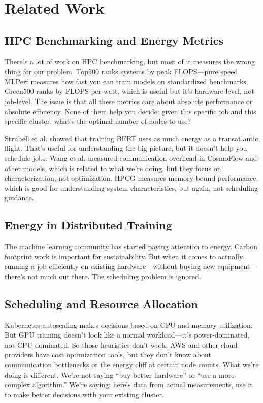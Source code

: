 \documentclass[conference]{IEEEtran}
\begin{document}
\section{Related Work}

\subsection{HPC Benchmarking and Energy Metrics}

There's a lot of work on HPC benchmarking, but most of it measures the wrong thing for our problem. Top500 ranks systems by peak FLOPS---pure speed. MLPerf measures how fast you can train models on standardized benchmarks. Green500 ranks by FLOPS per watt, which is useful but it's hardware-level, not job-level. The issue is that all these metrics care about absolute performance or absolute efficiency. None of them help you decide: given this specific job and this specific cluster, what's the optimal number of nodes to use?

Strubell et al. \cite{Strubell2019} showed that training BERT uses as much energy as a transatlantic flight. That's useful for understanding the big picture, but it doesn't help you schedule jobs. Wang et al. \cite{Wang2024} measured communication overhead in CosmoFlow and other models, which is related to what we're doing, but they focus on characterization, not optimization. HPCG \cite{Dongarra2013} measures memory-bound performance, which is good for understanding system characteristics, but again, not scheduling guidance.

\subsection{Energy in Distributed Training}

The machine learning community has started paying attention to energy. Carbon footprint work is important for sustainability. But when it comes to actually running a job efficiently on existing hardware---without buying new equipment---there's not much out there. The scheduling problem is ignored.

\subsection{Scheduling and Resource Allocation}

Kubernetes autoscaling makes decisions based on CPU and memory utilization. But GPU training doesn't look like a normal workload---it's power-dominated, not CPU-dominated. So those heuristics don't work. AWS and other cloud providers have cost optimization tools, but they don't know about communication bottlenecks or the energy cliff at certain node counts. What we're doing is different. We're not saying ``buy better hardware'' or ``use a more complex algorithm.'' We're saying: here's data from actual measurements, use it to make better decisions with your existing cluster.
\end{document}

